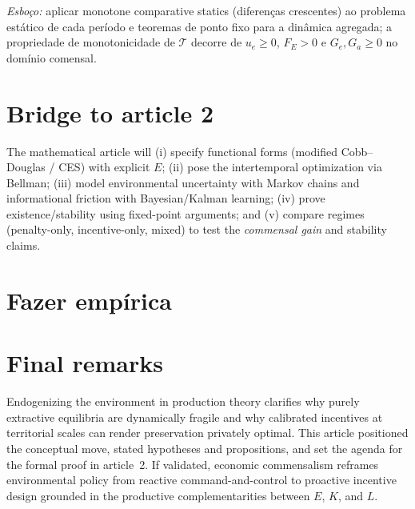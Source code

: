 \documentclass[a4paper,12pt,oneside,brazil,english]{abntex2}
\begin{document}
\noindent
\textit{Esboço:} aplicar monotone comparative statics (diferenças crescentes) ao problema estático de cada período e teoremas de ponto fixo para a dinâmica agregada; a propriedade de monotonicidade de $\mathcal{T}$ decorre de $u_e\ge 0$, $F_E>0$ e $G_e,G_a\ge 0$ no domínio comensal.


\section{Bridge to article 2}

The mathematical article will (i) specify functional forms (modified Cobb--Douglas / CES) with explicit $E$; 
(ii) pose the intertemporal optimization via Bellman; 
(iii) model environmental uncertainty with Markov chains and informational friction with Bayesian/Kalman learning; 
(iv) prove existence/stability using fixed-point arguments; and 
(v) compare regimes (penalty-only, incentive-only, mixed) to test the \textit{commensal gain} and stability claims.

\section{Fazer empírica}

\section{Final remarks}

Endogenizing the environment in production theory clarifies why purely extractive equilibria are dynamically fragile and why calibrated incentives at territorial scales can render preservation privately optimal. 
This article positioned the conceptual move, stated hypotheses and propositions, and set the agenda for the formal proof in article~2. 
If validated, economic commensalism reframes environmental policy from reactive command-and-control to proactive incentive design grounded in the productive complementarities between $E$, $K$, and $L$.

\clearpage


\end{document}
